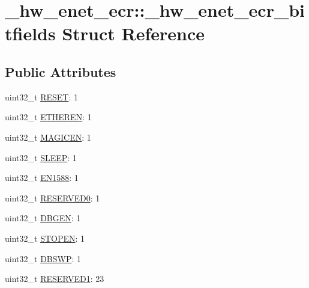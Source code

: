 \hypertarget{struct__hw__enet__ecr_1_1__hw__enet__ecr__bitfields}{}\section{\+\_\+hw\+\_\+enet\+\_\+ecr\+:\+:\+\_\+hw\+\_\+enet\+\_\+ecr\+\_\+bitfields Struct Reference}
\label{struct__hw__enet__ecr_1_1__hw__enet__ecr__bitfields}
\subsection*{Public Attributes}
\begin{DoxyCompactItemize}
\item 
uint32\+\_\+t \hyperlink{struct__hw__enet__ecr_1_1__hw__enet__ecr__bitfields_ad33cbb4f1ab9e41a13abebaacb229819}{R\+E\+S\+ET}\+: 1
\item 
uint32\+\_\+t \hyperlink{struct__hw__enet__ecr_1_1__hw__enet__ecr__bitfields_adf29fcac54ca70ef7f95ff26de1b0b89}{E\+T\+H\+E\+R\+EN}\+: 1
\item 
uint32\+\_\+t \hyperlink{struct__hw__enet__ecr_1_1__hw__enet__ecr__bitfields_a59a651e0d3add3cbfc823c6edecceecf}{M\+A\+G\+I\+C\+EN}\+: 1
\item 
uint32\+\_\+t \hyperlink{struct__hw__enet__ecr_1_1__hw__enet__ecr__bitfields_a695a4c3640716d44cd895c80b0fef59c}{S\+L\+E\+EP}\+: 1
\item 
uint32\+\_\+t \hyperlink{struct__hw__enet__ecr_1_1__hw__enet__ecr__bitfields_ae1e8934029ed505fb435150134ddf194}{E\+N1588}\+: 1
\item 
uint32\+\_\+t \hyperlink{struct__hw__enet__ecr_1_1__hw__enet__ecr__bitfields_a89f75272635644fbe33bfbf0782d36a0}{R\+E\+S\+E\+R\+V\+E\+D0}\+: 1
\item 
uint32\+\_\+t \hyperlink{struct__hw__enet__ecr_1_1__hw__enet__ecr__bitfields_aba85a0fa412f8f677d51c61b45e67760}{D\+B\+G\+EN}\+: 1
\item 
uint32\+\_\+t \hyperlink{struct__hw__enet__ecr_1_1__hw__enet__ecr__bitfields_a4e3efdb81447c668ae6b4404a76536c9}{S\+T\+O\+P\+EN}\+: 1
\item 
uint32\+\_\+t \hyperlink{struct__hw__enet__ecr_1_1__hw__enet__ecr__bitfields_a14257cde017deb5e5cee731510650454}{D\+B\+S\+WP}\+: 1
\item 
uint32\+\_\+t \hyperlink{struct__hw__enet__ecr_1_1__hw__enet__ecr__bitfields_a57789989c2e0ee0df2e75b0f2eb26ab2}{R\+E\+S\+E\+R\+V\+E\+D1}\+: 23
\end{DoxyCompactItemize}


